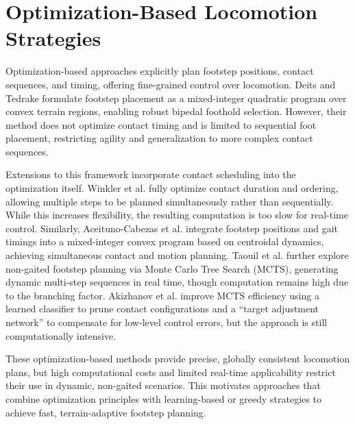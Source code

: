 \section{Optimization-Based Locomotion Strategies}
\label{sec:optimization-based-locomotion-strategies}

Optimization-based approaches explicitly plan footstep positions,
contact sequences, and timing, offering fine-grained control over
locomotion. Deits and Tedrake \cite{deits_footstep_2014} formulate
footstep placement as a mixed-integer quadratic program over convex
terrain regions, enabling robust bipedal foothold selection. However,
their method does not optimize contact timing and is limited to
sequential foot placement, restricting agility and generalization to
more complex contact sequences.

Extensions to this framework incorporate contact scheduling into the
optimization itself. Winkler et al. \cite{winkler_gait_2018} fully
optimize contact duration and ordering, allowing multiple steps to be
planned simultaneously rather than sequentially. While this increases
flexibility, the resulting computation is too slow for real-time
control. Similarly, Aceituno-Cabezas et al.
\cite{aceituno_simultaneous_2019} integrate footstep positions and
gait timings into a mixed-integer convex program based on centroidal
dynamics, achieving simultaneous contact and motion planning. Taouil
et al. \cite{taouil_non-gaited_2025} further explore non-gaited
footstep planning via Monte Carlo Tree Search (MCTS), generating
dynamic multi-step sequences in real time, though computation remains
high due to the branching factor. Akizhanov et al.
\cite{akizhanov_learning_2024} improve MCTS efficiency using a
learned classifier to prune contact configurations and a “target
adjustment network” to compensate for low-level control errors, but
the approach is still computationally intensive.

These optimization-based methods provide precise, globally consistent
locomotion plans, but high computational costs and limited real-time
applicability restrict their use in dynamic, non-gaited scenarios.
This motivates approaches that combine optimization principles with
learning-based or greedy strategies to achieve fast, terrain-adaptive
footstep planning.
